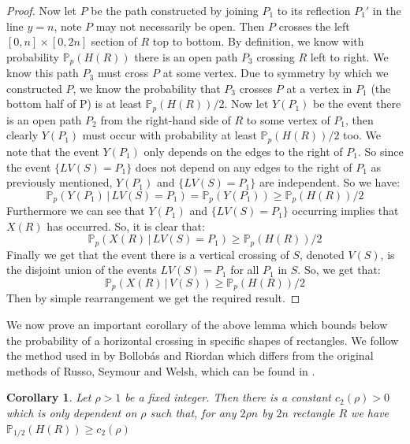 \documentclass[a4paper,11pt]{article}
\newtheorem{corollary}[theorem]{Corollary}
\theoremstyle{definition}
\newcommand{\prob}{\mathbb{P}_p}
\begin{document}
\begin{proof}
	Now let $P$ be the path constructed by joining $P_1$ to its reflection $P_1'$ in the line $y=n$, note $P$ may not necessarily be open. Then $P$ crosses the left $[0,n] \times [0,2n]$ section of $R$ top to bottom. By definition, we know with probability $\prob(H(R))$ there is an open path $P_3$ crossing $R$ left to right. We know this path $P_3$ must cross $P$ at some vertex. Due to symmetry by which we constructed $P$, we know the probability that $P_3$ crosses $P$ at a vertex in $P_1$ (the bottom half of P) is at least $\prob(H(R))/2$. Now let $Y(P_1)$ be the event there is an open path $P_2$ from the right-hand side of $R$ to some vertex of $P_1$, then clearly $Y(P_1)$ must occur with probability at least $\prob(H(R))/2$ too. We note that the event $Y(P_1)$ only depends on the edges to the right of $P_1$. So since the event $\{LV(S) = P_1\}$ does not depend on any edges to the right of $P_1$ as previously mentioned, $Y(P_1)$ and $\{LV(S) = P_1\}$ are independent. So we have:
	$$\prob(Y(P_1) \, | \, LV(S) = P_1) = \prob(Y(P_1)) \geq \prob(H(R))/2 $$
	Furthermore we can see that $Y(P_1)$ and $\{LV(S) = P_1\}$ occurring implies that $X(R)$ has occurred. So, it is clear that:
	$$\prob(X(R) \, | \, LV(S) = P_1) \geq \prob(H(R))/2 $$
	Finally we get that the event there is a vertical crossing of $S$, denoted $V(S)$, is the disjoint union of the events ${LV(S) = P_1}$ for all $P_1$ in $S$. So, we get that:
	$$\prob(X(R) \, | \, V(S)) \geq \prob(H(R))/2 $$
	Then by simple rearrangement we get the required result.

\end{proof}

We now prove an important corollary of the above lemma which bounds below the probability of a horizontal crossing in specific shapes of rectangles. We follow the method used in \cite{bollobas2006short} by Bollob\'as and Riordan which differs from the original methods of Russo, Seymour and Welsh, which can be found in \cite{grimmett1999percolation}.

\begin{corollary}\label{rectangleBound}
	Let $\rho >1$ be a fixed integer. Then there is a constant $c_2(\rho) > 0$ which is only dependent on $\rho$ such that, for any $2\rho n$ by $2n$ rectangle $R$ we have $\mathbb{P}_{1/2}(H(R)) \geq c_2(\rho)$
\end{corollary}
\end{document}
